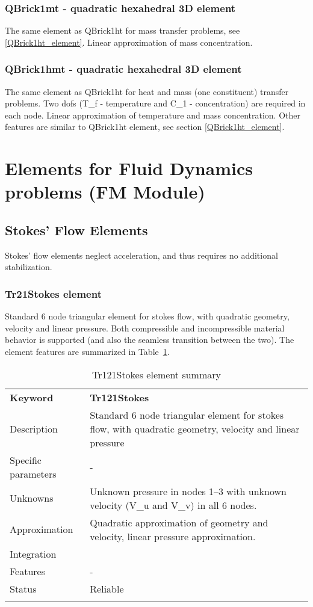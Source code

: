 \documentclass[a4paper]{article}
\newcommand{\param}[1]{\texttt{#1}} %
\newcommand{\templabel}{}%
\newcommand{\tempcaption}{}%
\newcounter{nelpar}
\newenvironment{elementsummary}[5]{%
  \gdef\tempcaption{#4}%
  \gdef\templabel{#5}%
  \setcounter{nelpar}{0}%
  \begin{center} %
    \begin{table}[!htb] %
      \begin{tabular}{|l|p{9cm}|}\hline %
        {\bf Keyword} & \bf{#1}\\ %
        {Description} & {#2}\\ %
        {Specific parameters} & {#3}\\ \hline %
}{
  \\ \hline %
      \end{tabular}%
      \caption{\tempcaption}%
      \label{\templabel}%
    \end{table}%
  \end{center}%
}
\newcommand{\elementParam}[1]{%
  \ifthenelse{\value{nelpar}>0} %
             {&{#1}}%
             {\setcounter{nelpar}{1}Parameters&{#1}}%
             \\%
}
\newcommand{\elementDescription}[2]{{#1} & {#2}\\ }
\begin{document}
\subsubsection{QBrick1mt - quadratic hexahedral 3D element}
The same element as QBrick1ht for mass transfer problems, see \ref{QBrick1ht_element}. 
Linear approximation of mass concentration.

\subsubsection{QBrick1hmt - quadratic hexahedral 3D element}
The same element as QBrick1ht for
heat and mass (one constituent) transfer problems. 
Two dofs (T\_f - temperature and C\_1 - concentration) are required in
each node. Linear approximation of temperature and mass concentration.
Other features are similar to QBrick1ht element, see section \ref{QBrick1ht_element}.


\clearpage
\section{Elements for Fluid Dynamics problems (FM Module)}
\subsection{Stokes' Flow Elements}
Stokes' flow elements neglect acceleration, and thus requires no additional stabilization.

\subsubsection{Tr21Stokes element}
Standard 6 node triangular element for stokes flow, with quadratic geometry, velocity and linear pressure.
Both compressible and incompressible material behavior is supported (and also the seamless transition between the two).
The element features are summarized in Table~\ref{Tr121Stokessummary}.

\begin{elementsummary}{Tr121Stokes}{Standard 6 node triangular element for stokes flow, with quadratic geometry, velocity and linear pressure}{-}{Tr121Stokes element summary}{Tr121Stokessummary}
\elementDescription{Unknowns}{Unknown pressure in nodes 1--3 with unknown velocity (V\_u and V\_v) in all 6 nodes.}
\elementDescription{Approximation}{Quadratic approximation of geometry and velocity, linear pressure approximation.}
\elementDescription{Integration}{}
\elementDescription{Features}{-}
\elementDescription{Status}{Reliable}
\end{elementsummary}
\end{document}
